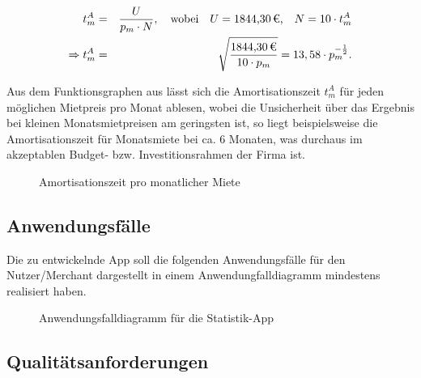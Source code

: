 \begin{eqnarray}
	t^{A}_m &=& \frac{U}{p_m \cdot N},\quad \mbox{wobei}\quad U = \mbox{\eur{1844,30},}\quad N = 10 \cdot t_m^{A}\\
	\Rightarrow t^{A}_m &=& \sqrt{\frac{\eur{1844,30}}{10 \cdot p_m}} = 13,58 \cdot p_m^{-\frac{1}{2}}.
\end{eqnarray}

Aus dem Funktionsgraphen aus  lässt sich die Amortisationszeit $t_m^{A}$ für jeden möglichen Mietpreis pro Monat ablesen, wobei die Unsicherheit über das Ergebnis bei kleinen Monatsmietpreisen am geringsten ist, so liegt beispielsweise die Amortisationszeit für  Monatsmiete bei ca. 6 Monaten, was durchaus im akzeptablen Budget- bzw. Investitionsrahmen der Firma ist.

\begin{figure}[htb]
\centering
{}
\caption{Amortisationszeit pro monatlicher Miete}
\label{fig:AM}
\end{figure}

\subsection{Anwendungsfälle}
\label{sec:Anwendungsfaelle}

Die zu entwickelnde App soll die folgenden Anwendungsfälle für den Nutzer/Merchant dargestellt in einem Anwendungfalldiagramm mindestens 
realisiert haben.

\begin{figure}[htb]
\centering
{}
\caption{Anwendungsfalldiagramm für die Statistik-App}
\label{fig:usecase2}
\end{figure}


\subsection{Qualitätsanforderungen}
\label{sec:Qualitaetsanforderungen}

